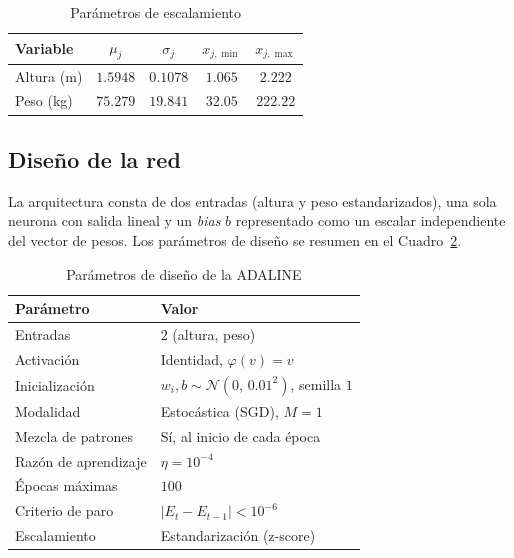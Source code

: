 \documentclass[conference]{IEEEtran}
\begin{document}
\begin{table}[htbp]
\caption{Parámetros de escalamiento}
\label{tab:escala}
\begin{center}
\begin{tabular}{lcccc}
\toprule
\textbf{Variable} & $\mu_j$ & $\sigma_j$ & $x_{j,\min}$ & $x_{j,\max}$ \\
\midrule
Altura (m) & $1.5948$ & $0.1078$ & $1.065$ & $2.222$ \\
Peso (kg)  & $75.279$ & $19.841$ & $32.05$ & $222.22$ \\
\bottomrule
\end{tabular}
\end{center}
\end{table}

\subsection{Diseño de la red}
La arquitectura consta de dos entradas (altura y peso estandarizados), una
sola neurona con salida lineal y un \textit{bias} $b$ representado como un
escalar independiente del vector de pesos. Los parámetros de diseño se
resumen en el Cuadro~\ref{tab:diseno}.

\begin{table}[htbp]
\caption{Parámetros de diseño de la ADALINE}
\label{tab:diseno}
\begin{center}
\begin{tabular}{ll}
\toprule
\textbf{Parámetro} & \textbf{Valor} \\
\midrule
Entradas            & $2$ (altura, peso) \\
Activación          & Identidad, $\varphi(v)=v$ \\
Inicialización      & $w_i,b\sim\mathcal{N}(0,\,0.01^2)$, semilla $1$ \\
Modalidad           & Estocástica (SGD), $M=1$ \\
Mezcla de patrones  & Sí, al inicio de cada época \\
Razón de aprendizaje& $\eta=10^{-4}$ \\
Épocas máximas      & $100$ \\
Criterio de paro    & $|E_{t}-E_{t-1}|<10^{-6}$ \\
Escalamiento        & Estandarización (z-score) \\
\bottomrule
\end{tabular}
\end{center}
\end{table}
\end{document}
